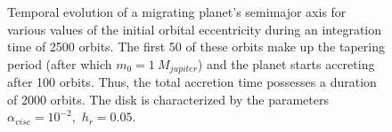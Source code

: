 
      \clearpage
      \begin{figure}[h!]
        \centering
        \begin{minipage}{.5\linewidth}
          \centering
        \end{minipage}%
        \begin{minipage}{.5\linewidth}
          \centering
        \end{minipage}
        \caption{
            Temporal evolution of a migrating planet's semimajor axis for 
            various values of the initial orbital eccentricity
            during an integration time of 2500 orbits. The first 50 of 
            these orbits make up the tapering 
            period (after which $m_0=1\ M_{jupiter}$) and the planet starts 
            accreting after 100 orbits. Thus, the total accretion time 
            possesses a duration of 2000 orbits.
            The disk is characterized by the parameters 
            $\alpha_{visc}=10^{-2}$,\ $h_r=0.05$.
        }
        \label{fig:semimajor_axis_vs_t_and_e0}
      \end{figure}
      
